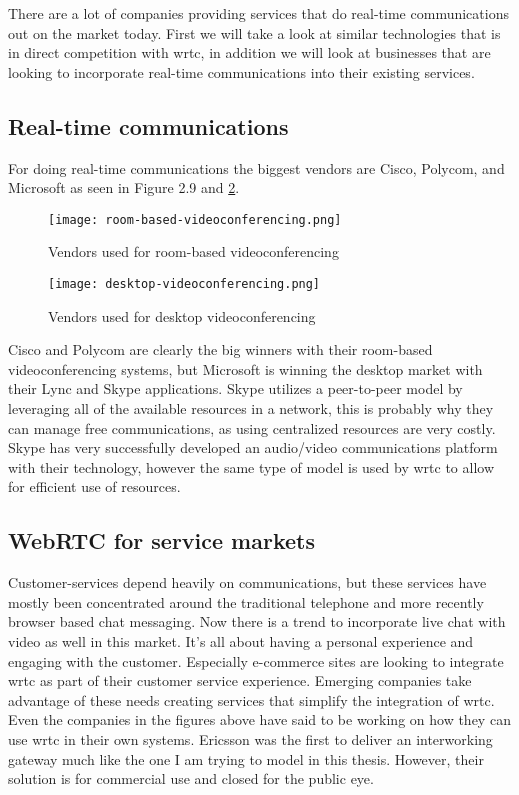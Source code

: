 There are a lot of companies providing services that do real-time communications out on the market today. First we will take a look at similar technologies\cite{lopez_fernandez_catalysing_2013} that is in direct competition with \gls{wrtc}, in addition we will look at businesses that are looking to incorporate real-time communications into their existing services.

\subsection{Real-time communications}
For doing real-time communications the biggest vendors are Cisco, Polycom, and Microsoft as seen in Figure 2.9 and \ref{fig:desktop-videoconferencing}.

\begin{figure}[here]
\centerline{\texttt{[image: room-based-videoconferencing.png]}}
\label{fig:room-based-videoconferencing}
\caption{Vendors used for room-based videoconferencing}
\end{figure}

\begin{figure}[here]
\centerline{\texttt{[image: desktop-videoconferencing.png]}}
\caption{Vendors used for desktop videoconferencing}
\label{fig:desktop-videoconferencing}
\end{figure}

Cisco and Polycom are clearly the big winners with their room-based videoconferencing systems, but Microsoft is winning the desktop market with their Lync and Skype applications. Skype utilizes a peer-to-peer model by leveraging all of the available resources in a network, this is probably why they can manage free communications, as using centralized resources are very costly. Skype has very successfully developed an audio/video communications platform with their technology, however the same type of model is used by \gls{wrtc} to allow for efficient use of resources.

\subsection{WebRTC for service markets}
Customer-services depend heavily on communications, but these services have mostly been concentrated around the traditional telephone and more recently browser based chat messaging. Now there is a trend to incorporate live chat with video as well in this market\cite{amazon_mayday}. It's all about having a personal experience and engaging with the customer. Especially e-commerce sites are looking to integrate \gls{wrtc} as part of their customer service experience. Emerging companies take advantage of these needs creating services that simplify the integration of \gls{wrtc}. Even the companies in the figures above have said to be working on how they can use \gls{wrtc} in their own systems\cite{polycom-webrtc}. Ericsson was the first to deliver an interworking gateway\cite{ericsson-gateway} much like the one I am trying to model in this thesis. However, their solution is for commercial use and closed for the public eye.

